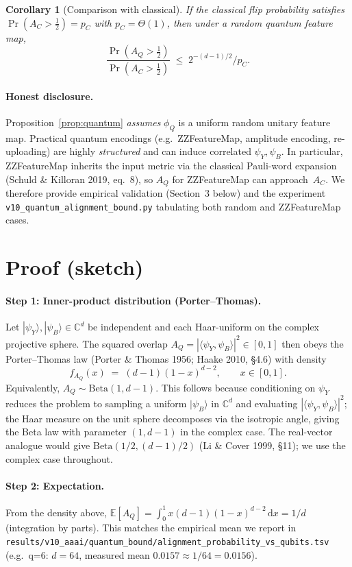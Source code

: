 \documentclass[11pt,a4paper]{article}
\newtheorem{corollary}{Corollary}
\newcommand{\C}{\mathbb{C}}
\newcommand{\E}{\mathbb{E}}
\begin{document}
\begin{corollary}[Comparison with classical]
\label{cor:ratio}
If the classical flip probability satisfies $\Pr(A_C>\tfrac12)=p_{\!C}$
with $p_{\!C}=\Theta(1)$, then under a random quantum feature map,
\[
  \frac{\Pr(A_Q>\tfrac12)}{\Pr(A_C>\tfrac12)}
  \;\le\; 2^{-(d-1)/2}\big/ p_{\!C}.
\]
\end{corollary}

\paragraph{Honest disclosure.}
Proposition~\ref{prop:quantum} \emph{assumes} $\phi_Q$ is a uniform
random unitary feature map. Practical quantum encodings
(e.g.\ ZZFeatureMap, amplitude encoding, re-uploading) are highly
\emph{structured} and can induce correlated $\psi_Y,\psi_B$. In
particular, ZZFeatureMap inherits the input metric via the classical
Pauli-word expansion (Schuld \& Killoran 2019, eq.~8), so $A_Q$ for
ZZFeatureMap can approach~$A_C$. We therefore provide empirical
validation (Section~3 below) and the experiment
\texttt{v10\_quantum\_alignment\_bound.py} tabulating both random and
ZZFeatureMap cases.

\section{Proof (sketch)}

\paragraph{Step 1: Inner-product distribution (Porter--Thomas).}
Let $|\psi_Y\rangle,|\psi_B\rangle\in\C^{d}$ be independent and each
Haar-uniform on the complex projective sphere. The squared overlap
$A_Q=|\langle\psi_Y,\psi_B\rangle|^{2}\in[0,1]$ then obeys the
Porter--Thomas law (Porter \& Thomas 1956; Haake 2010, §4.6) with
density
\[
   f_{A_Q}(x) \;=\; (d-1)(1-x)^{d-2}, \qquad x\in[0,1].
\]
Equivalently, $A_Q\sim\mathrm{Beta}(1,d-1)$. This follows because
conditioning on $\psi_Y$ reduces the problem to sampling a uniform
$|\psi_B\rangle$ in $\C^d$ and evaluating $|\langle\psi_Y,\psi_B\rangle|^2$;
the Haar measure on the unit sphere decomposes via the isotropic
angle, giving the Beta law with parameter $(1,d-1)$ in the complex
case. The real-vector analogue would give $\mathrm{Beta}(1/2,(d-1)/2)$
(Li \& Cover 1999, §11); we use the complex case throughout.

\paragraph{Step 2: Expectation.}
From the density above,
$\E[A_Q]=\int_0^1 x(d-1)(1-x)^{d-2}\,\mathrm{d}x = 1/d$ (integration by
parts). This matches the empirical mean we report in
\texttt{results/v10\_aaai/quantum\_bound/alignment\_probability\_vs\_qubits.tsv}
(e.g.\ q=6: $d=64$, measured mean $0.0157 \approx 1/64 = 0.0156$).
\end{document}

